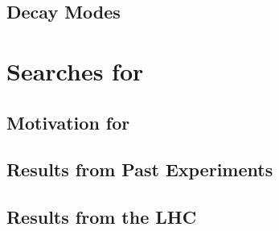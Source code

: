 \subsection{Decay Modes}

\section{Searches for \VHbb}

\subsection{Motivation for \VHbb}

\subsection{Results from Past Experiments}

\subsection{Results from the LHC}




%
%
%

